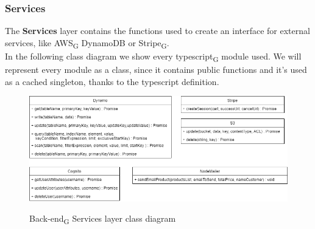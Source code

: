 \subsubsection{Services}
The \textbf{Services} layer contains the functions used to create an interface for external services, like AWS\textsubscript{G} DynamoDB or Stripe\textsubscript{G}.\\
In the following class diagram we show every typescript\textsubscript{G} module used. We will represent every module as a class, since it contains public functions and it's used as a cached singleton, thanks to the typescript definition.

\begin{figure}[H]
\centering
\includegraphics[scale=0.60]{res/Architettura/Backend/img/services_class}\\
\caption{Back-end\textsubscript{G} Services layer class diagram}
\end{figure}


